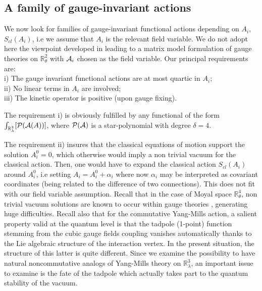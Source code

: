\documentclass[a4paper,11pt]{article}
\numberwithin{equation}{section}
\newcommand\Rl{\mathbb{R}^3_\lambda}
\theoremstyle{nonumberplain}
\begin{document}
\subsection{A family of gauge-invariant actions}\label{subsection232}

We now look for families of gauge-invariant functional actions 
 depending on $A_i$, $S_{cl}(A_i)$, i.e we assume that $A_i$ is the relevant field variable. We do not adopt here the viewpoint developed in \cite{MVW13} leading to a matrix model formulation of gauge theories on $\mathbb{R}^2_\theta$ with ${\cal{A}}_i$ chosen as the field variable. Our principal requirements are:\\
i) The gauge invariant functional actions 
are at most quartic in $A_i$;\\
ii) No linear terms in $A_i$ are involved;\\
iii) The kinetic operator is positive (upon gauge fixing).\par 

The requirement i) is obviously fulfilled by any functional of the form $\int_{\Rl}[{\cal{P}}({\cal{A}}(A))]$, where ${\cal{P}}({\cal{A}})$ is a star-polynomial with degree $\delta=4$.\par 
The requirement ii) insures that the classical equations of motion support the solution $A^0_i=0$, which otherwise would imply a non trivial vacuum for the classical action. Then, one would have to expand the classical action $S_{cl}(A_i)$ around $A^0_i$, i.e setting $A_i=A^0_i+\alpha_i$ where now $\alpha_i$ may be interpreted as covariant coordinates (being related to the difference of two connections). This does not fit with our field variable assumption. Recall that in the case of Moyal space $\mathbb{R}^4_\theta$, non trivial vacuum solutions are known to occur within gauge theories \cite{Wallet:2007c}, \cite{GWW2} generating huge difficulties. Recall also that for the commutative Yang-Mills action, a salient property valid at the quantum level is that the tadpole (1-point) function stemming from the cubic gauge fields coupling vanishes automatically thanks to the Lie algebraic structure of the interaction vertex. In the present situation, the structure of this latter is quite different. Since we examine the possibility to have natural noncommutative analogs of Yang-Mills theory on $\mathbb{R}^3_\lambda$, an important issue to examine is the fate of the tadpole which actually takes part to the quantum stability of the vacuum. \par 
\end{document}

